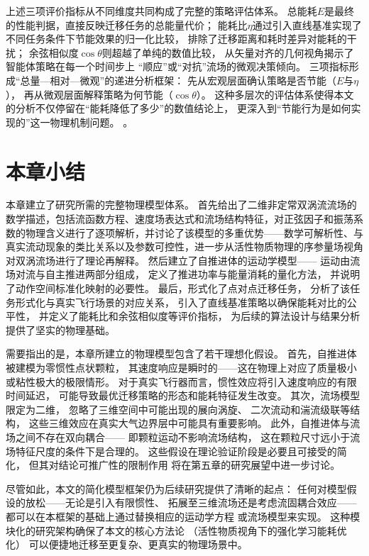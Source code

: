 上述三项评价指标从不同维度共同构成了完整的策略评估体系。
总能耗$E$是最终的性能判据，直接反映迁移任务的总能量代价；
能耗比$\eta$通过引入直线基准实现了不同任务条件下节能效果的归一化比较，
排除了迁移距离和耗时差异对能耗的干扰；
余弦相似度$\cos\theta$则超越了单纯的数值比较，
从矢量对齐的几何视角揭示了智能体策略在每一个时间步上
“顺应”或“对抗”流场的微观决策倾向。
三项指标形成“总量—相对—微观”的递进分析框架：
先从宏观层面确认策略是否节能（$E$与$\eta$），
再从微观层面解释策略为何节能（$\cos\theta$）。
这种多层次的评估体系使得本文的分析不仅停留在“能耗降低了多少”的数值结论上，
更深入到“节能行为是如何实现的”这一物理机制问题。
。

\section{本章小结}

本章建立了研究所需的完整物理模型体系。
首先给出了二维非定常双涡流流场的数学描述，包括流函数方程、速度场表达式和流场结构特征，对正弦因子和振荡系数的物理含义进行了逐项解析，并讨论了该模型的多重优势——数学可解析性、与真实流动现象的类比关系以及参数可控性，进一步从活性物质物理的序参量场视角对双涡流场进行了理论再解释。
然后建立了自推进体的运动学模型——
运动由流场对流与自主推进两部分组成，
定义了推进功率与能量消耗的量化方法，
并说明了动作空间标准化映射的必要性。
最后，形式化了点对点迁移任务，
分析了该任务形式化与真实飞行场景的对应关系，
引入了直线基准策略以确保能耗对比的公平性，
并定义了能耗比和余弦相似度等评价指标，
为后续的算法设计与结果分析提供了坚实的物理基础。

需要指出的是，本章所建立的物理模型包含了若干理想化假设。
首先，自推进体被建模为零惯性点状颗粒，
其速度响应是瞬时的——这在物理上对应了质量极小或粘性极大的极限情形。
对于真实飞行器而言，惯性效应将引入速度响应的有限时间延迟，
可能导致最优迁移策略的形态和能耗特征发生改变。
其次，流场模型限定为二维，
忽略了三维空间中可能出现的展向涡旋、
二次流动和湍流级联等结构，
这些三维效应在真实大气边界层中可能具有重要影响。
此外，自推进体与流场之间不存在双向耦合——
即颗粒运动不影响流场结构，
这在颗粒尺寸远小于流场特征尺度的条件下是合理的。
这些假设在理论验证阶段是必要且可接受的简化，
但其对结论可推广性的限制作用
将在第五章的研究展望中进一步讨论。

尽管如此，本文的简化模型框架仍为后续研究提供了清晰的起点：
任何对模型假设的放松——无论是引入有限惯性、
拓展至三维流场还是考虑流固耦合效应——
都可以在本框架的基础上通过替换相应的运动学方程
或流场模型来实现。
这种模块化的研究架构确保了本文的核心方法论
（活性物质视角下的强化学习能耗优化）
可以便捷地迁移至更复杂、更真实的物理场景中。
